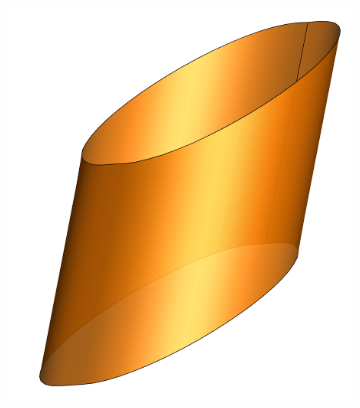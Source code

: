 \documentclass[8pt, aspectratio=169]{beamer}
\begin{document}
\begin{frame}
\begin{figure}[H]
\begin{subfigure}{.3\textwidth}
		\end{subfigure}
		\begin{subfigure}{.3\textwidth}
			\includegraphics[width=\textwidth]{../../tec/interchannel/03.png}
		\end{subfigure}
	\end{figure}
	\vfill
\end{frame}
\end{document}
